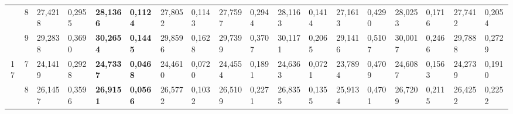 \documentclass[conference]{IEEEtran}
\begin{document}
\begin{table*}[]
\begin{tabular}{|cc|ll|ll|ll|ll|ll|ll|ll|ll|}
		\multicolumn{1}{|c|}{}                    & 8          & \multicolumn{1}{l|}{27,4218}           & 0,2955                            & \multicolumn{1}{l|}{\textbf{28,1366}}  & \textbf{0,1124}                   & \multicolumn{1}{l|}{27,8052}           & 0,1143                            & \multicolumn{1}{l|}{27,7597}           & 0,2944                            & \multicolumn{1}{l|}{28,1163}           & 0,1414                            & \multicolumn{1}{l|}{27,1613}           & 0,4290                            & \multicolumn{1}{l|}{28,0253}           & 0,1716                            & \multicolumn{1}{l|}{27,7412}           & 0,2054                            \\ \cline{2-18} 
		\multicolumn{1}{|c|}{}                    & 9          & \multicolumn{1}{l|}{29,2838}           & 0,3690                            & \multicolumn{1}{l|}{\textbf{30,2654}}  & \textbf{0,1445}                   & \multicolumn{1}{l|}{29,8596}           & 0,1628                            & \multicolumn{1}{l|}{29,7399}           & 0,3707                            & \multicolumn{1}{l|}{30,1171}           & 0,2065                            & \multicolumn{1}{l|}{29,1416}           & 0,5107                            & \multicolumn{1}{l|}{30,0017}           & 0,2466                            & \multicolumn{1}{l|}{29,7888}           & 0,2729                            \\ \hline
		\multicolumn{1}{|c|}{\multirow{3}{*}{17}} & 7          & \multicolumn{1}{l|}{24,1419}           & 0,2928                            & \multicolumn{1}{l|}{\textbf{24,7337}}  & \textbf{0,0468}                   & \multicolumn{1}{l|}{24,4610}           & 0,0720                            & \multicolumn{1}{l|}{24,4554}           & 0,1891                            & \multicolumn{1}{l|}{24,6363}           & 0,0721                            & \multicolumn{1}{l|}{23,7894}           & 0,4709                            & \multicolumn{1}{l|}{24,6087}           & 0,1563                            & \multicolumn{1}{l|}{24,2739}           & 0,1910                            \\ \cline{2-18} 
		\multicolumn{1}{|c|}{}                    & 8          & \multicolumn{1}{l|}{26,1457}           & 0,3596                            & \multicolumn{1}{l|}{\textbf{26,9151}}  & \textbf{0,0566}                   & \multicolumn{1}{l|}{26,5772}           & 0,1032                            & \multicolumn{1}{l|}{26,5109}           & 0,2271                            & \multicolumn{1}{l|}{26,8355}           & 0,1355                            & \multicolumn{1}{l|}{25,9134}           & 0,4701                            & \multicolumn{1}{l|}{26,7209}           & 0,2115                            & \multicolumn{1}{l|}{26,4252}           & 0,2252                            \\ \cline{2-18} 

\end{tabular}
\end{table*}
\end{document}
